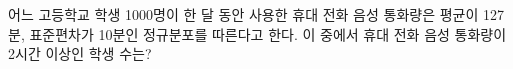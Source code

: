 어느 고등학교 학생 1000명이 한 달 동안 사용한 휴대 전화 음성 통화량은 평균이 127분, 표준편차가 10분인 정규분포를 따른다고 한다. 이 중에서 휴대 전화 음성 통화량이 2시간 이상인 학생 수는? 
